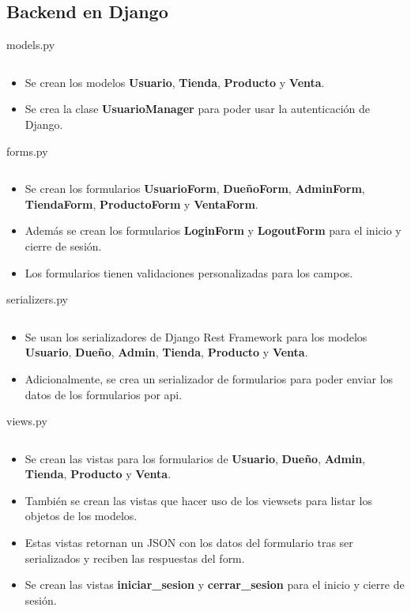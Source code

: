 \documentclass{article}
\newenvironment{block}{\captionsetup{type=listing}}{}
\begin{document}
\subsection{Backend en Django}
\begin{block}
	\caption{models.py}
	\inputminted[breaklines]{Python}{kioskios_api/api/models.py}
	\begin{itemize}
		\item Se crean los modelos \textbf{Usuario}, \textbf{Tienda}, \textbf{Producto} y \textbf{Venta}.
		\item Se crea la clase \textbf{UsuarioManager} para poder usar la autenticación de Django.
	\end{itemize}

	\caption{forms.py}
	\inputminted{Python}{kioskios_api/api/forms.py}
	\begin{itemize}
		\item Se crean los formularios \textbf{UsuarioForm}, \textbf{DueñoForm}, \textbf{AdminForm}, \textbf{TiendaForm}, \textbf{ProductoForm} y \textbf{VentaForm}.
		\item Además se crean los formularios \textbf{LoginForm} y \textbf{LogoutForm} para el inicio y cierre de sesión.
		\item Los formularios tienen validaciones personalizadas para los campos.
	\end{itemize}

	\caption{serializers.py}
	\inputminted[breaklines]{Python}{kioskios_api/api/serializers.py}
	\begin{itemize}
		\item Se usan los serializadores de Django Rest Framework para los modelos \textbf{Usuario}, \textbf{Dueño}, \textbf{Admin}, \textbf{Tienda}, \textbf{Producto} y \textbf{Venta}.
		\item Adicionalmente, se crea un serializador de formularios para poder enviar los datos de los formularios por api.
	\end{itemize}

	\caption{views.py}
	\inputminted[breaklines]{Python}{kioskios_api/api/views.py}
	\begin{itemize}
		\item Se crean las vistas para los formularios de \textbf{Usuario}, \textbf{Dueño}, \textbf{Admin}, \textbf{Tienda}, \textbf{Producto} y \textbf{Venta}.
		\item También se crean las vistas que hacer uso de los viewsets para listar los objetos de los modelos.
		\item Estas vistas retornan un JSON con los datos del formulario tras ser serializados y reciben las respuestas del form.
		\item Se crean las vistas \textbf{iniciar\_sesion} y \textbf{cerrar\_sesion} para el inicio y cierre de sesión.
	\end{itemize}


\end{block}
\end{document}

